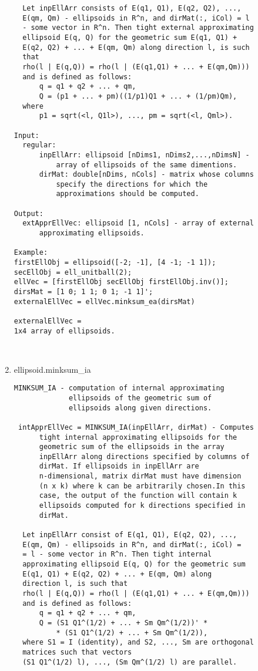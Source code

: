 \begin{enumerate}
\begin{lstlisting}
  Let inpEllArr consists of E(q1, Q1), E(q2, Q2), ...,
  E(qm, Qm) - ellipsoids in R^n, and dirMat(:, iCol) = l
  - some vector in R^n. Then tight external approximating
  ellipsoid E(q, Q) for the geometric sum E(q1, Q1) +
  E(q2, Q2) + ... + E(qm, Qm) along direction l, is such
  that
  rho(l | E(q,Q)) = rho(l | (E(q1,Q1) + ... + E(qm,Qm)))
  and is defined as follows:
      q = q1 + q2 + ... + qm,
      Q = (p1 + ... + pm)((1/p1)Q1 + ... + (1/pm)Qm),
  where
      p1 = sqrt(<l, Q1l>), ..., pm = sqrt(<l, Qml>).

Input:
  regular:
      inpEllArr: ellipsoid [nDims1, nDims2,...,nDimsN] -
          array of ellipsoids of the same dimentions.
      dirMat: double[nDims, nCols] - matrix whose columns
          specify the directions for which the
          approximations should be computed.

Output:
  extApprEllVec: ellipsoid [1, nCols] - array of external
      approximating ellipsoids.

Example:
firstEllObj = ellipsoid([-2; -1], [4 -1; -1 1]);
secEllObj = ell_unitball(2);
ellVec = [firstEllObj secEllObj firstEllObj.inv()];
dirsMat = [1 0; 1 1; 0 1; -1 1]';
externalEllVec = ellVec.minksum_ea(dirsMat)

externalEllVec =
1x4 array of ellipsoids.



\end{lstlisting}
\fontfamily{\familydefault}
\selectfont
\item {ellipsoid.minksum\_ia}
\selectfont
\begin{lstlisting}
MINKSUM_IA - computation of internal approximating
             ellipsoids of the geometric sum of
             ellipsoids along given directions.

 intApprEllVec = MINKSUM_IA(inpEllArr, dirMat) - Computes
      tight internal approximating ellipsoids for the
      geometric sum of the ellipsoids in the array
      inpEllArr along directions specified by columns of
      dirMat. If ellipsoids in inpEllArr are
      n-dimensional, matrix dirMat must have dimension
      (n x k) where k can be arbitrarily chosen.In this
      case, the output of the function will contain k
      ellipsoids computed for k directions specified in
      dirMat.

  Let inpEllArr consist of E(q1, Q1), E(q2, Q2), ...,
  E(qm, Qm) - ellipsoids in R^n, and dirMat(:, iCol) =
  = l - some vector in R^n. Then tight internal
  approximating ellipsoid E(q, Q) for the geometric sum
  E(q1, Q1) + E(q2, Q2) + ... + E(qm, Qm) along
  direction l, is such that
  rho(l | E(q,Q)) = rho(l | (E(q1,Q1) + ... + E(qm,Qm)))
  and is defined as follows:
      q = q1 + q2 + ... + qm,
      Q = (S1 Q1^(1/2) + ... + Sm Qm^(1/2))' *
          * (S1 Q1^(1/2) + ... + Sm Qm^(1/2)),
  where S1 = I (identity), and S2, ..., Sm are orthogonal
  matrices such that vectors
  (S1 Q1^(1/2) l), ..., (Sm Qm^(1/2) l) are parallel.


\end{lstlisting}
\end{enumerate}

